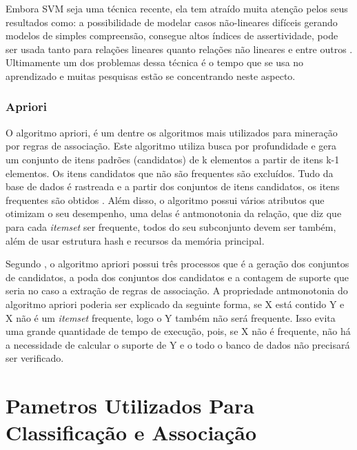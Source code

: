 \par
Embora SVM seja uma técnica recente, ela tem atraído muita atenção pelos seus resultados como: a possibilidade de modelar casos não-lineares difíceis gerando modelos de simples compreensão, consegue altos índices de assertividade, pode ser usada tanto para relações lineares quanto relações não lineares e entre outros \cite{Camilo2009}. Ultimamente um dos problemas dessa técnica é o tempo que se usa no aprendizado e muitas pesquisas estão se concentrando neste aspecto. 


\subsubsection{Apriori}

\par
O algoritmo apriori, é um dentre os algoritmos mais utilizados para mineração por regras de associação. Este algoritmo utiliza busca por profundidade e gera um conjunto de itens padrões (candidatos) de k elementos a partir de itens k-1 elementos. Os itens candidatos que não são frequentes são excluídos. Tudo da base de dados é rastreada e a partir dos conjuntos de itens candidatos, os itens frequentes são obtidos \cite{Vasconcelos2004}. Além disso, o algoritmo possui vários atributos que otimizam o seu desempenho, uma delas é antmonotonia da relação, que diz que para cada \textit{itemset} ser frequente, todos do seu subconjunto devem ser também, além de usar estrutura hash e recursos da memória principal.

\par
Segundo , o algoritmo apriori possui três processos que é a geração dos conjuntos de candidatos, a poda dos conjuntos dos candidatos e a contagem de suporte que seria no caso a extração de regras de associação. A propriedade antmonotonia do algoritmo apriori poderia ser explicado da seguinte forma, se X está contido Y e X não é um \textit{itemset} frequente, logo o Y também não será frequente. Isso evita uma grande quantidade de tempo de execução, pois, se X não é frequente, não há a necessidade de calcular o suporte de Y e o todo o banco de dados não precisará ser verificado.


\section{Pametros Utilizados Para Classificação e Associação}

